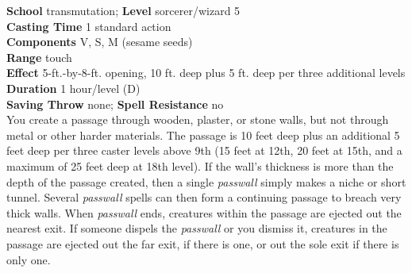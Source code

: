 \textbf{School} transmutation; \textbf{Level} sorcerer/wizard 5\\
\textbf{Casting Time} 1 standard action\\
\textbf{Components} V, S, M (sesame seeds)\\
\textbf{Range} touch\\
\textbf{Effect} 5-ft.-by-8-ft. opening, 10 ft. deep plus 5 ft. deep per three additional levels\\
\textbf{Duration} 1 hour/level (D)\\
\textbf{Saving Throw} none; \textbf{Spell Resistance} no\\
You create a passage through wooden, plaster, or stone walls, but not through metal or other harder materials. The passage is 10 feet deep plus an additional 5 feet deep per three caster levels above 9th (15 feet at 12th, 20 feet at 15th, and a maximum of 25 feet deep at 18th level). If the wall's thickness is more than the depth of the passage created, then a single \textit{passwall }simply makes a niche or short tunnel. Several \textit{passwall }spells can then form a continuing passage to breach very thick walls. When \textit{passwall }ends, creatures within the passage are ejected out the nearest exit. If someone dispels the \textit{passwall }or you dismiss it, creatures in the passage are ejected out the far exit, if there is one, or out the sole exit if there is only one.\\
